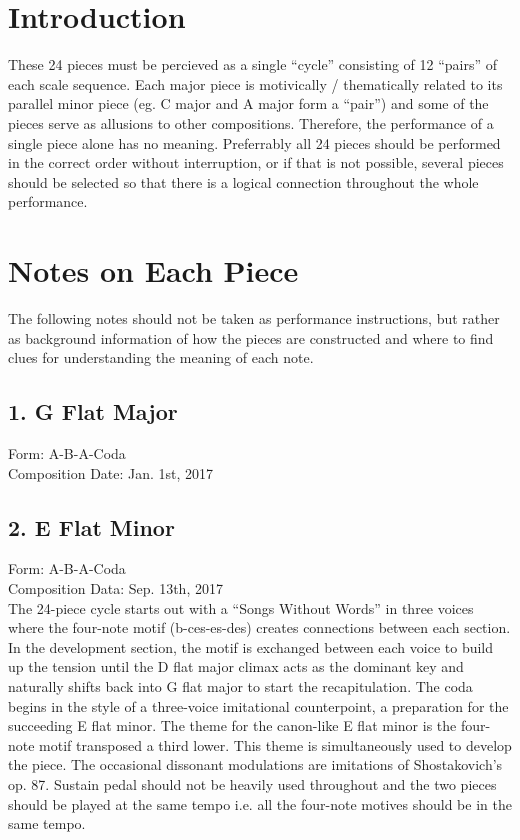 \documentclass{jarticle}
\begin{document}
\section*{Introduction}
These 24 pieces must be percieved as a single ``cycle'' consisting of 12 ``pairs'' of each scale sequence. Each major piece is motivically / thematically related to its parallel minor piece (eg. C major and A major form a ``pair'') and some of the pieces serve as allusions to other compositions. Therefore, the performance of a single piece alone has no meaning. Preferrably all 24 pieces should be performed in the correct order without interruption, or if that is not possible, several pieces should be selected so that there is a logical connection throughout the whole performance. \\




\section*{Notes on Each Piece}
The following notes should not be taken as performance instructions, but rather as background information of how the pieces are constructed and where to find clues for understanding the meaning of each note. \\

\subsection*{1. G Flat Major}
Form: A-B-A-Coda \\
Composition Date: Jan. 1st, 2017 \\

\subsection*{2. E Flat Minor}
Form: A-B-A-Coda \\
Composition Data: Sep. 13th, 2017 \\


The 24-piece cycle starts out with a ``Songs Without Words'' in three voices where the four-note motif (b-ces-es-des) creates connections between each section. In the development section, the motif is exchanged between each voice to build up the tension until the D flat major climax acts as the dominant key and naturally shifts back into G flat major to start the recapitulation. The coda begins in the style of a three-voice imitational counterpoint, a preparation for the succeeding E flat minor. The theme for the canon-like E flat minor is the four-note motif transposed a third lower.  This theme is simultaneously used to develop the piece. The occasional dissonant modulations are imitations of Shostakovich's op. 87. Sustain pedal should not be heavily used throughout and the two pieces should be played at the same tempo i.e. all the four-note motives should be in the same tempo.\\
\end{document}
